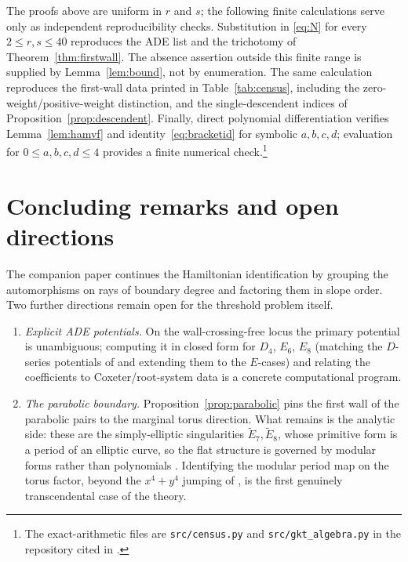\documentclass[11pt]{amsart}
\theoremstyle{definition}
\theoremstyle{remark}
\begin{document}
The proofs above are uniform in $r$ and $s$; the following finite calculations
serve only as independent reproducibility checks.  Substitution in
\eqref{eq:N} for every $2\le r,s\le40$ reproduces the ADE list and the
trichotomy of Theorem~\ref{thm:firstwall}.  The absence assertion outside this
finite range is supplied by Lemma~\ref{lem:bound}, not by enumeration.  The
same calculation reproduces the first-wall data printed in
Table~\ref{tab:census}, including the zero-weight/positive-weight distinction,
and the single-descendent indices of Proposition~\ref{prop:descendent}.
Finally, direct polynomial differentiation verifies
Lemma~\ref{lem:hamvf} and identity~\eqref{eq:bracketid} for symbolic
$a,b,c,d$; evaluation for $0\le a,b,c,d\le4$ provides a finite numerical
check.\footnote{The exact-arithmetic files are \texttt{src/census.py} and
\texttt{src/gkt\_algebra.py} in the repository cited in \cite{companion}.}
\section*{Concluding remarks and open directions}

The companion paper \cite{companion} continues the Hamiltonian identification
by grouping the automorphisms on rays of boundary degree and factoring them in
slope order.  Two further directions remain open for the threshold problem
itself.

\begin{enumerate}
\item \emph{Explicit ADE potentials.} On the wall-crossing-free locus the
primary potential is unambiguous; computing it in closed form for $D_{4}$,
$E_{6}$, $E_{8}$ (matching the $D$-series potentials of \cite{BB21} and
extending them to the $E$-cases) and relating the coefficients to
Coxeter/root-system data is a concrete computational program.
\item \emph{The parabolic boundary.} Proposition~\ref{prop:parabolic} pins the
first wall of the parabolic pairs to the marginal torus direction. What
remains is the analytic side: these are the simply-elliptic singularities
$\widetilde E_{7},\widetilde E_{8}$, whose primitive form is a period of an
elliptic curve, so the flat structure is governed by modular forms rather than
polynomials \cite[\S4.2.2]{Maher}. Identifying the modular period map on the
torus factor, beyond the $x^{4}+y^{4}$ jumping of
\cite[Example~4.9]{GKTsurvey}, is the first genuinely transcendental case of
the theory.
\end{enumerate}
\end{document}
